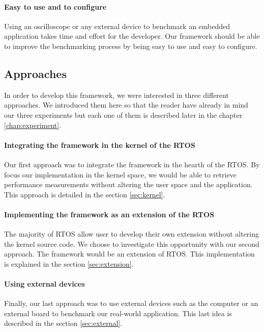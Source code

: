 \paragraph{Easy to use and to configure}
Using an oscilloscope or any external device to benchmark an embedded application takes time and effort for the developer.
Our framework should be able to improve the benchmarking process by being easy to use and easy to configure.

\subsection{Approaches}

In order to develop this framework, we were interested in three different approaches.
We introduced them here so that the reader have already in mind our three experiments but each one of them is described later in the chapter \ref{chap:experiment}.

\paragraph{Integrating the framework in the kernel of the RTOS}
Our first approach was to integrate the framework in the hearth of the RTOS.
By focus our implementation in the kernel space, we would be able to retrieve performance measurements without altering the user space and the application.
This approach is detailed in the section \ref{sec:kernel}.

\paragraph{Implementing the framework as an extension of the RTOS}
The majority of RTOS allow user to develop their own extension without altering the kernel source code.
We choose to investigate this opportunity with our second approach.
The framework would be an extension of RTOS.
This implementation is explained in the section \ref{sec:extension}.

\paragraph{Using external devices}
Finally, our last approach was to use external devices such as the computer or an external board to benchmark our real-world application.
This last idea is described in the section \ref{sec:external}.
